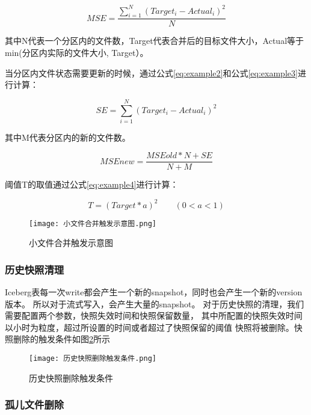 \begin{equation}
  MSE=\frac {\sum_{i=1}^{N}{(Target_i - Actual_i)^2}} {N}
  \label{eq:example1}
\end{equation}

其中N代表一个分区内的文件数，Target代表合并后的目标文件大小，Actual等于min(分区内实际的文件大小, Target）。

当分区内文件状态需要更新的时候，通过公式\ref{eq:example2}和公式\ref{eq:example3}进行计算：

\begin{equation}
  SE=\sum_{i=1}^{N}{(Target_i - Actual_i)^2}
  \label{eq:example2}
\end{equation}

其中M代表分区内的新的文件数。

\begin{equation}
  MSEnew=\frac {MSEold*N+SE} {N+M}
  \label{eq:example3}
\end{equation}

阈值T的取值通过公式\ref{eq:example4}进行计算：

\begin{equation}
  T=(Target*a)^2 \qquad (0<a<1)
  \label{eq:example4}
\end{equation}

\begin{figure}[H]
  \centering
  \texttt{[image: 小文件合并触发示意图.png]}
  \caption{小文件合并触发示意图}
  \label{fig:小文件合并触发示意图}
\end{figure}

\subsubsection{历史快照清理}

Iceberg表每一次write都会产生一个新的snapshot，同时也会产生一个新的version版本。
所以对于流式写入，会产生大量的snapshot。
对于历史快照的清理，我们需要配置两个参数，快照失效时间和快照保留数量，
其中所配置的快照失效时间以小时为粒度，超过所设置的时间或者超过了快照保留的阈值
快照将被删除。快照删除的触发条件如图\ref{fig:历史快照删除触发条件}所示

\begin{figure}[H]
  \centering
  \texttt{[image: 历史快照删除触发条件.png]}
  \caption{历史快照删除触发条件}
  \label{fig:历史快照删除触发条件}
\end{figure}

\subsubsection{孤儿文件删除}

